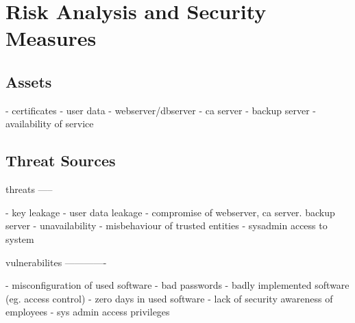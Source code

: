 \documentclass[english]{article}
\begin{document}
%


\section{Risk Analysis and Security Measures}

\subsection{Assets}


- certificates
- user data
- webserver/dbserver
- ca server
- backup server
- availability of service


\subsection{Threat Sources}

threats
-----

- key leakage
- user data leakage
- compromise of webserver, ca server. backup server
- unavailability
- misbehaviour of trusted entities
- sysadmin access to system

vulnerabilites
-------------

- misconfiguration of used software
- bad passwords
- badly implemented software (eg. access control)
- zero days in used software
- lack of security awareness of employees
- sys admin access privileges




\end{document}
